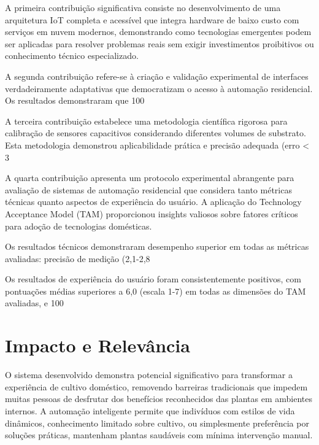 A primeira contribuição significativa consiste no desenvolvimento de uma arquitetura IoT completa e acessível que integra hardware de baixo custo com serviços em nuvem modernos, demonstrando como tecnologias emergentes podem ser aplicadas para resolver problemas reais sem exigir investimentos proibitivos ou conhecimento técnico especializado.

A segunda contribuição refere-se à criação e validação experimental de interfaces verdadeiramente adaptativas que democratizam o acesso à automação residencial. Os resultados demonstraram que 100%

A terceira contribuição estabelece uma metodologia científica rigorosa para calibração de sensores capacitivos considerando diferentes volumes de substrato. Esta metodologia demonstrou aplicabilidade prática e precisão adequada (erro < 3%

A quarta contribuição apresenta um protocolo experimental abrangente para avaliação de sistemas de automação residencial que considera tanto métricas técnicas quanto aspectos de experiência do usuário. A aplicação do Technology Acceptance Model (TAM) proporcionou insights valiosos sobre fatores críticos para adoção de tecnologias domésticas.

Os resultados técnicos demonstraram desempenho superior em todas as métricas avaliadas: precisão de medição (2,1-2,8%

Os resultados de experiência do usuário foram consistentemente positivos, com pontuações médias superiores a 6,0 (escala 1-7) em todas as dimensões do TAM avaliadas, e 100%

\section{Impacto e Relevância}

O sistema desenvolvido demonstra potencial significativo para transformar a experiência de cultivo doméstico, removendo barreiras tradicionais que impedem muitas pessoas de desfrutar dos benefícios reconhecidos das plantas em ambientes internos. A automação inteligente permite que indivíduos com estilos de vida dinâmicos, conhecimento limitado sobre cultivo, ou simplesmente preferência por soluções práticas, mantenham plantas saudáveis com mínima intervenção manual.

